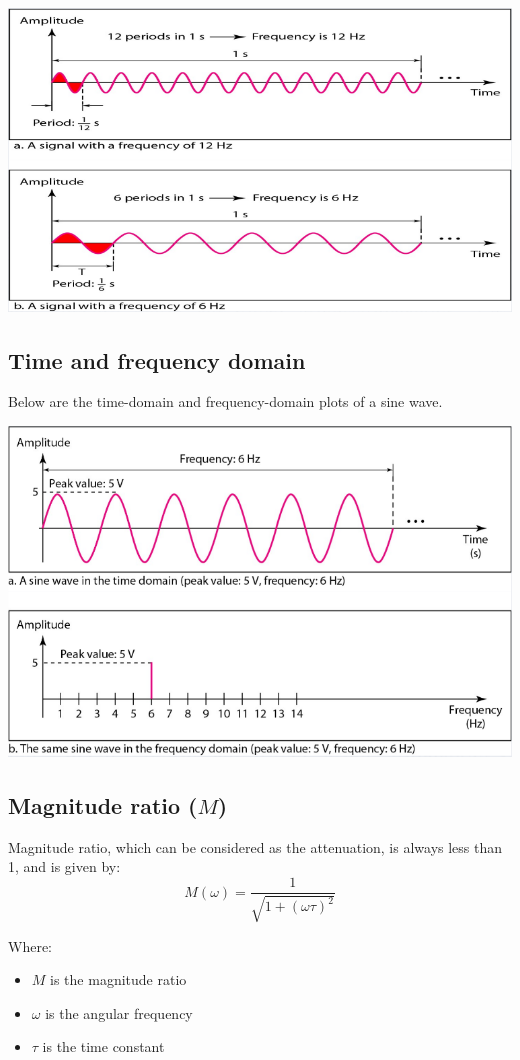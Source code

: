 \documentclass[11pt]{article}
\begin{document}
\begin{center}
\includegraphics[width=.9\linewidth]{./images/period-and-frequency-images.png}
\end{center}
\subsection{Time and frequency domain}
\label{sec:orgff360e9}
Below are the time-domain and frequency-domain plots of a sine wave.

\begin{center}
\includegraphics[width=.9\linewidth]{./images/time-domain-and-frequency-domain-images.png}
\end{center}
\subsection{Magnitude ratio (\(M\))}
\label{sec:orgab69ff3}
Magnitude ratio, which can be considered as the attenuation, is always less than 1, and is given by:
\[M(\omega) = \frac{1}{\sqrt{1 + (\omega \tau)^2}}\]

Where:
\begin{itemize}
\item \(M\) is the magnitude ratio
\item \(\omega\) is the angular frequency
\item \(\tau\) is the time constant
\end{itemize}
\end{document}
